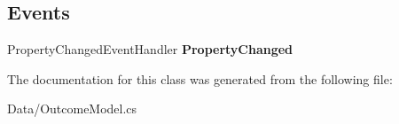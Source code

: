 \subsection*{Events}
\begin{DoxyCompactItemize}
\item 
\mbox{\label{class_a_f_h___scheduler_1_1_data_1_1_outcome_model_ad57fbd59d9623c588b56b44ca0c1af23}} 
Property\+Changed\+Event\+Handler {\bfseries Property\+Changed}
\end{DoxyCompactItemize}


The documentation for this class was generated from the following file\+:\begin{DoxyCompactItemize}
\item 
Data/Outcome\+Model.\+cs\end{DoxyCompactItemize}
